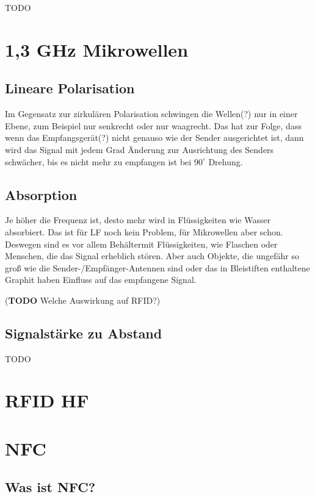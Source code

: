 \documentclass[a4paper,11pt,headsepline,footsepline,parskip=half]{scrartcl}
\begin{document}
TODO

\section{1,3 GHz Mikrowellen}

\subsection{Lineare Polarisation}

Im Gegensatz zur zirkulären Polarisation schwingen die Wellen(?) nur in einer Ebene, zum Beispiel nur senkrecht oder nur waagrecht.
Das hat zur Folge, dass wenn das Empfangsgerät(?) nicht genauso wie der Sender ausgerichtet ist, dann wird das Signal mit jedem Grad Änderung
zur Ausrichtung des Senders schwächer, bis es nicht mehr zu empfangen ist bei $90^\circ$ Drehung.

\subsection{Absorption}

Je höher die Frequenz ist, desto mehr wird in Flüssigkeiten wie Wasser absorbiert. Das ist für LF noch kein Problem, für Mikrowellen aber schon.
Deswegen sind es vor allem \glqq Behälter\grqq mit Flüssigkeiten, wie Flaschen oder Menschen, die das Signal erheblich stören. Aber auch
Objekte, die ungefähr so groß wie die Sender-/Empfänger-Antennen sind oder das in Bleistiften enthaltene Graphit haben Einfluss auf das
empfangene Signal.

(\textbf{TODO} Welche Auswirkung auf RFID?)

\subsection{Signalstärke zu Abstand}

TODO

\section{RFID HF}

\section{NFC}

\subsection{Was ist NFC?}
\end{document}
